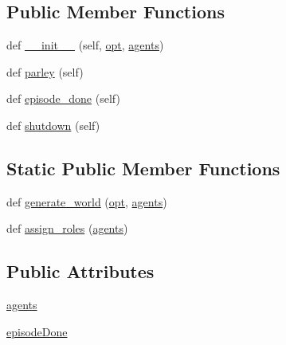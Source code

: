 \subsection*{Public Member Functions}
\begin{DoxyCompactItemize}
\item 
def \hyperlink{classparlai_1_1chat__service_1_1tasks_1_1overworld__demo_1_1worlds_1_1MessengerChatTaskWorld_a4092cb3b80c2af7884b5368db1803433}{\+\_\+\+\_\+init\+\_\+\+\_\+} (self, \hyperlink{classparlai_1_1core_1_1worlds_1_1World_a3640d92718acd3e6942a28c1ab3678bd}{opt}, \hyperlink{classparlai_1_1chat__service_1_1tasks_1_1overworld__demo_1_1worlds_1_1MessengerChatTaskWorld_a1200af6151240a7a23e9ab3bf6518713}{agents})
\item 
def \hyperlink{classparlai_1_1chat__service_1_1tasks_1_1overworld__demo_1_1worlds_1_1MessengerChatTaskWorld_ad8adfac6e3387073aa4e2e85de513baf}{parley} (self)
\item 
def \hyperlink{classparlai_1_1chat__service_1_1tasks_1_1overworld__demo_1_1worlds_1_1MessengerChatTaskWorld_aeb3b20ce2eab8076ead6e7c687c2d435}{episode\+\_\+done} (self)
\item 
def \hyperlink{classparlai_1_1chat__service_1_1tasks_1_1overworld__demo_1_1worlds_1_1MessengerChatTaskWorld_a4a047cbd2ada8c30aabdee9d8452582e}{shutdown} (self)
\end{DoxyCompactItemize}
\subsection*{Static Public Member Functions}
\begin{DoxyCompactItemize}
\item 
def \hyperlink{classparlai_1_1chat__service_1_1tasks_1_1overworld__demo_1_1worlds_1_1MessengerChatTaskWorld_a1c448c458108763a93921eab8c155cb6}{generate\+\_\+world} (\hyperlink{classparlai_1_1core_1_1worlds_1_1World_a3640d92718acd3e6942a28c1ab3678bd}{opt}, \hyperlink{classparlai_1_1chat__service_1_1tasks_1_1overworld__demo_1_1worlds_1_1MessengerChatTaskWorld_a1200af6151240a7a23e9ab3bf6518713}{agents})
\item 
def \hyperlink{classparlai_1_1chat__service_1_1tasks_1_1overworld__demo_1_1worlds_1_1MessengerChatTaskWorld_a41d19ef34f9bdc9423c1284e8758601c}{assign\+\_\+roles} (\hyperlink{classparlai_1_1chat__service_1_1tasks_1_1overworld__demo_1_1worlds_1_1MessengerChatTaskWorld_a1200af6151240a7a23e9ab3bf6518713}{agents})
\end{DoxyCompactItemize}
\subsection*{Public Attributes}
\begin{DoxyCompactItemize}
\item 
\hyperlink{classparlai_1_1chat__service_1_1tasks_1_1overworld__demo_1_1worlds_1_1MessengerChatTaskWorld_a1200af6151240a7a23e9ab3bf6518713}{agents}
\item 
\hyperlink{classparlai_1_1chat__service_1_1tasks_1_1overworld__demo_1_1worlds_1_1MessengerChatTaskWorld_a7116fc4cba0cd04fb7854dd3e837cec7}{episode\+Done}
\end{DoxyCompactItemize}
